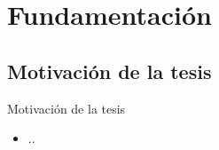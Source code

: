 \section{Fundamentación}

\subsection{Motivación de la tesis}
\begin{frame}{Motivación de la tesis}
	\scriptsize
	\begin{itemize} [<+>]
		\item ..
	\end{itemize}
\end{frame}